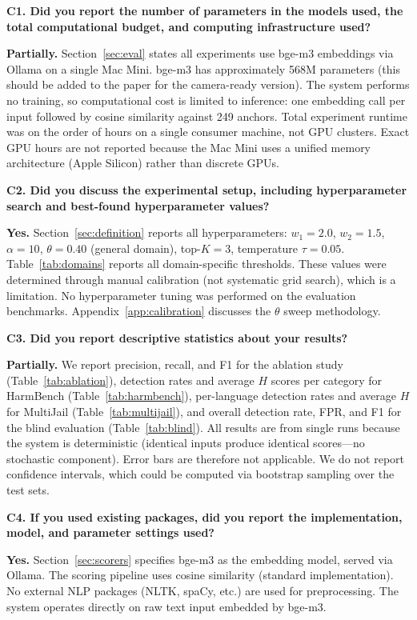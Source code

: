 \textbf{C1. Did you report the number of parameters in the models used, the total computational budget, and computing infrastructure used?}

\textbf{Partially.} Section~\ref{sec:eval} states all experiments use bge-m3 embeddings via Ollama on a single Mac Mini. bge-m3 has approximately 568M parameters (this should be added to the paper for the camera-ready version). The system performs no training, so computational cost is limited to inference: one embedding call per input followed by cosine similarity against 249 anchors. Total experiment runtime was on the order of hours on a single consumer machine, not GPU clusters. Exact GPU hours are not reported because the Mac Mini uses a unified memory architecture (Apple Silicon) rather than discrete GPUs.

\textbf{C2. Did you discuss the experimental setup, including hyperparameter search and best-found hyperparameter values?}

\textbf{Yes.} Section~\ref{sec:definition} reports all hyperparameters: $w_1{=}2.0$, $w_2{=}1.5$, $\alpha{=}10$, $\theta{=}0.40$ (general domain), top-$K{=}3$, temperature $\tau{=}0.05$. Table~\ref{tab:domains} reports all domain-specific thresholds. These values were determined through manual calibration (not systematic grid search), which is a limitation. No hyperparameter tuning was performed on the evaluation benchmarks. Appendix~\ref{app:calibration} discusses the $\theta$ sweep methodology.

\textbf{C3. Did you report descriptive statistics about your results?}

\textbf{Partially.} We report precision, recall, and F1 for the ablation study (Table~\ref{tab:ablation}), detection rates and average $H$ scores per category for HarmBench (Table~\ref{tab:harmbench}), per-language detection rates and average $H$ for MultiJail (Table~\ref{tab:multijail}), and overall detection rate, FPR, and F1 for the blind evaluation (Table~\ref{tab:blind}). All results are from single runs because the system is deterministic (identical inputs produce identical scores---no stochastic component). Error bars are therefore not applicable. We do not report confidence intervals, which could be computed via bootstrap sampling over the test sets.

\textbf{C4. If you used existing packages, did you report the implementation, model, and parameter settings used?}

\textbf{Yes.} Section~\ref{sec:scorers} specifies bge-m3 as the embedding model, served via Ollama. The scoring pipeline uses cosine similarity (standard implementation). No external NLP packages (NLTK, spaCy, etc.) are used for preprocessing. The system operates directly on raw text input embedded by bge-m3.

